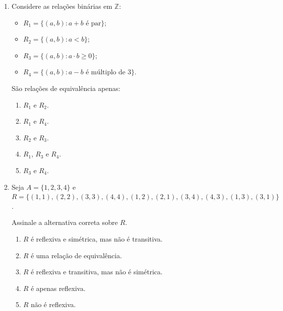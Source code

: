 \documentclass[12pt]{article}
\newcommand{\resposta}[1]{
\noindent
\framebox[\textwidth]{
\begin{minipage}{0.96\textwidth}
\vspace{#1}
\end{minipage}
}
}
\begin{document}
\begin{enumerate}
\resposta{7cm}

\newpage

\section*{Exercícios de Múltipla Escolha}

\item Considere as relações binárias em $\mathbb{Z}$:
\begin{itemize}
    \item $R_1 = \{(a, b) : a + b \text{ é par}\}$;
    \item $R_2 = \{(a, b) : a < b\}$;
    \item $R_3 = \{(a, b) : a \cdot b \geq 0\}$;
    \item $R_4 = \{(a, b) : a - b \text{ é múltiplo de 3}\}$.
\end{itemize}

São relações de equivalência apenas:
\begin{enumerate}[label=\Alph*)]
    \item $R_1$ e $R_2$.
    \item $R_1$ e $R_4$.
    \item $R_2$ e $R_3$.
    \item $R_1$, $R_3$ e $R_4$.
    \item $R_3$ e $R_4$.
\end{enumerate}

\vspace{0.8cm}

\item Seja $A = \{1,2,3,4\}$ e $R = \{(1,1),(2,2),(3,3),(4,4),(1,2),(2,1),(3,4),(4,3),(1,3),(3,1)\}$.

Assinale a alternativa correta sobre $R$.
\begin{enumerate}[label=\Alph*)]
    \item $R$ é reflexiva e simétrica, mas não é transitiva.
    \item $R$ é uma relação de equivalência.
    \item $R$ é reflexiva e transitiva, mas não é simétrica.
    \item $R$ é apenas reflexiva.
    \item $R$ não é reflexiva.
\end{enumerate}


\end{enumerate}
\end{document}
